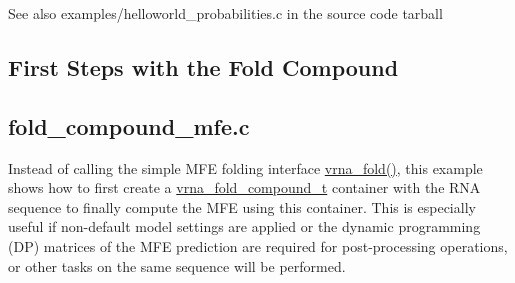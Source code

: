  \begin{DoxySeeAlso}{See also}
{\ttfamily examples/helloworld\+\_\+probabilities.\+c} in the source code tarball
\end{DoxySeeAlso}
\hypertarget{examples_c_ex_c_fc}{}\subsection{First Steps with the Fold Compound}\label{examples_c_ex_c_fc}
\subsection*{fold\+\_\+compound\+\_\+mfe.\+c }

Instead of calling the simple M\+FE folding interface \mbox{\hyperlink{group__mfe__fold__single_ga29a33b2895f4e67b0480271ff289afdc}{vrna\+\_\+fold()}}, this example shows how to first create a \mbox{\hyperlink{group__fold__compound_ga1b0cef17fd40466cef5968eaeeff6166}{vrna\+\_\+fold\+\_\+compound\+\_\+t}} container with the R\+NA sequence to finally compute the M\+FE using this container. This is especially useful if non-\/default model settings are applied or the dynamic programming (DP) matrices of the M\+FE prediction are required for post-\/processing operations, or other tasks on the same sequence will be performed.


